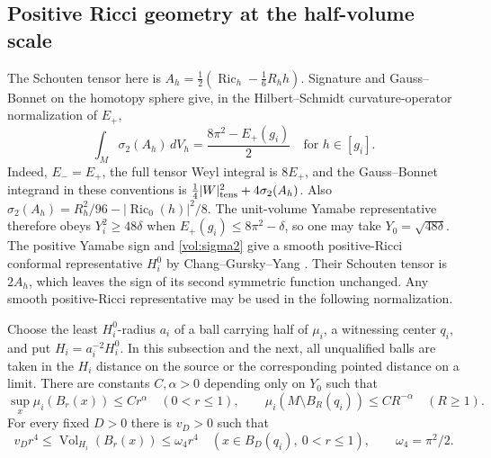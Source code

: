 \subsection{Positive Ricci geometry at the half-volume scale}
\label{vol:positive-ricci}

The Schouten tensor here is
\(A_h=\tfrac12(\operatorname{Ric}_h-\tfrac16R_h h)\).
Signature and Gauss--Bonnet on the homotopy sphere give, in the
Hilbert--Schmidt curvature-operator normalization of \(E_+\),
\begin{equation}
 \int_M\sigma_2(A_h)\,dV_h=\frac{8\pi^2-E_+(g_i)}{2}
 \quad\text{for }h\in[g_i].
 \label{vol:sigma2}
\end{equation}
Indeed, \(E_-=E_+\), the full tensor Weyl integral is \(8E_+\),
and the Gauss--Bonnet integrand in these conventions is
\(\tfrac14|W|_{\rm tens}^2+4\sigma_2(A_h)\).
Also \(\sigma_2(A_h)=R_h^2/96-|\operatorname{Ric}_0(h)|^2/8\).
The unit-volume Yamabe representative therefore obeys
\(Y_i^2\geq48\delta\) when \(E_+(g_i)\leq8\pi^2-\delta\), so one
may take \(Y_0=\sqrt{48\delta}\).
The positive Yamabe sign and \eqref{vol:sigma2} give a smooth
positive-Ricci conformal representative
\(H_i^0\) by Chang--Gursky--Yang
\cite[Theorem A and Corollary B]{ChangGurskyYang2002PositiveRicci}.
Their Schouten tensor is \(2A_h\), which leaves the sign of its
second symmetric function unchanged. Any smooth positive-Ricci
representative may be used in the following normalization.

\begin{theorem}
\label{vol:median}
Choose the least \(H_i^0\)-radius \(a_i\) of a ball carrying half of
\(\mu_i\), a witnessing center \(q_i\), and put
\(H_i=a_i^{-2}H_i^0\). In this subsection and the next, all unqualified
balls are taken in the \(H_i\) distance on the source or the
corresponding pointed distance on a limit. There are constants
\(C,\alpha>0\) depending only on \(Y_0\) such that
\begin{equation}
 \sup_x\mu_i(B_r(x))\leq C r^\alpha\quad(0<r\leq1),\qquad
 \mu_i(M\setminus B_R(q_i))\leq C R^{-\alpha}\quad(R\geq1).
 \label{vol:power}
\end{equation}
For every fixed \(D>0\) there is \(v_D>0\) such that
\begin{equation}
 v_D r^4\leq \operatorname{Vol}_{H_i}(B_r(x))
 \leq\omega_4 r^4\quad(x\in B_D(q_i),\ 0<r\leq1),\qquad
 \omega_4=\pi^2/2 .
 \label{vol:noncollapse}
\end{equation}
\end{theorem}

